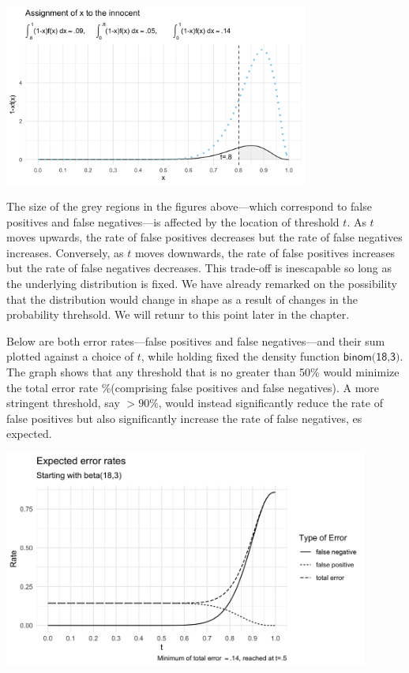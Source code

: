 \documentclass[
  10pt,
  dvipsnames,enabledeprecatedfontcommands]{scrartcl}
\begin{document}
\begin{center}
    \includegraphics[width=10cm]{nxfx3.png}
\end{center}

The size of the grey regions in the figures above---which correspond to
false positives and false negatives---is affected by the location of
threshold \(t\). As \(t\) moves upwards, the rate of false positives
decreases but the rate of false negatives increases. Conversely, as
\(t\) moves downwards, the rate of false positives increases but the
rate of false negatives decreases. This trade-off is inescapable so long
as the underlying distribution is fixed. We have already remarked on the
possibility that the distribution would change in shape as a result of
changes in the probability threhsold. We will retunr to this point later
in the chapter.

Below are both error rates---false positives and false negatives---and
their sum plotted against a choice of \(t\), while holding fixed the
density function \(\textsf{binom(18,3)}\). The graph shows that any
threshold that is no greater than 50\% would minimize the total error
rate \%(comprising false positives and false negatives). A more
stringent threshold, say \(>90\%\), would instead significantly reduce
the rate of false positives but also significantly increase the rate of
false negatives, es expected.

\begin{center}
    \includegraphics[width=12cm]{errors.png}
\end{center}
\end{document}
